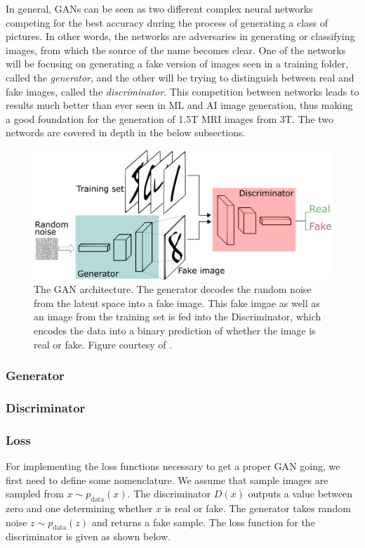 \documentclass[12pt, fleqn, titlepage]{article}
\begin{document}
In general, GANs can be seen as two different complex neural networks competing for the best accuracy during  the process of generating a class of pictures. In other words, the networks are adversaries in generating or classifying images, from which the source of the name becomes clear. One of the networks will be focusing on generating a fake version of images seen in a training folder, called the \textit{generator}, and the other will be trying to distinguish between real and fake images, called the \textit{discriminator}. This competition between networks leads to results much better than ever seen in ML and AI image generation, thus making a good foundation for the generation of 1.5T MRI images from 3T. The two networds are covered in depth in the below subsections.
\begin{figure}[H]
	\centering
	\includegraphics[width=0.7\linewidth]{"imgs/GAN architecture"}
	\caption{The GAN architecture. The generator decodes the random noise from the latent space into a fake image. This fake imgae as well as an image from the training set is fed into the Discriminator, which encodes the data into a binary prediction of whether the image is real or fake. Figure courtesy of \cite{gan_introduction_towards_datascience}.}
	\label{fig:gan-architecture}
\end{figure}


\subsubsection{Generator}


\subsubsection{Discriminator}


\subsubsection{Loss}
For implementing the loss functions necessary to get a proper GAN going, we first need to define some nomenclature. We assume that sample images are sampled from $x \sim p_{\text {data}}(x)$. The discriminator $D(x)$ outputs a value between zero and one determining whether $x$ is real or fake. The generator takes random noise $z \sim p_{\text {data}}(z)$ and returns a fake sample. The loss function for the discriminator is given as shown below.
\end{document}

